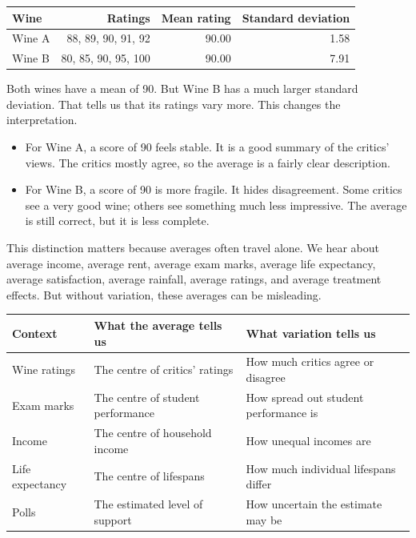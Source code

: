 \documentclass[
  letterpaper,
  DIV=11,
  numbers=noendperiod]{scrreprt}
\providecommand{\tightlist}{%
  \setlength{\itemsep}{0pt}\setlength{\parskip}{0pt}}
\begin{document}
\begin{table}
\fontsize{12.0pt}{14.0pt}\selectfont
\begin{tabular*}{\linewidth}{@{\extracolsep{\fill}}lrrr}
\toprule
Wine & Ratings & Mean rating & Standard deviation \\ 
\midrule\addlinespace[2.5pt]
Wine A & 88, 89, 90, 91, 92 & 90.00 & 1.58 \\ 
Wine B & 80, 85, 90, 95, 100 & 90.00 & 7.91 \\ 
\bottomrule
\end{tabular*}
\end{table}

Both wines have a mean of 90. But Wine B has a much larger standard
deviation. That tells us that its ratings vary more. This changes the
interpretation.

\begin{itemize}
\tightlist
\item
  For Wine A, a score of 90 feels stable. It is a good summary of the
  critics' views. The critics mostly agree, so the average is a fairly
  clear description.
\item
  For Wine B, a score of 90 is more fragile. It hides disagreement. Some
  critics see a very good wine; others see something much less
  impressive. The average is still correct, but it is less complete.
\end{itemize}

This distinction matters because averages often travel alone. We hear
about average income, average rent, average exam marks, average life
expectancy, average satisfaction, average rainfall, average ratings, and
average treatment effects. But without variation, these averages can be
misleading.

\begin{table}
\fontsize{12.0pt}{14.0pt}\selectfont
\begin{tabular*}{\linewidth}{@{\extracolsep{\fill}}lll}
\toprule
Context & What the average tells us & What variation tells us \\ 
\midrule\addlinespace[2.5pt]
Wine ratings & The centre of critics' ratings & How much critics agree or disagree \\ 
Exam marks & The centre of student performance & How spread out student performance is \\ 
Income & The centre of household income & How unequal incomes are \\ 
Life expectancy & The centre of lifespans & How much individual lifespans differ \\ 
Polls & The estimated level of support & How uncertain the estimate may be \\ 
\bottomrule
\end{tabular*}
\end{table}
\end{document}
